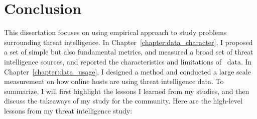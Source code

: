 \chapter{Conclusion}
\label{chapter:conclusion}

This dissertation focuses on using empirical approach to study 
problems surrounding threat intelligence. 
In Chapter~\ref{chapter:data_character}, I proposed 
a set of simple but also fundamental metrics, and measured a broad
set of threat intelligence sources, and reported the 
characteristics and limitations of \ti\ data. In 
Chapter~\ref{chapter:data_usage}, I designed a method and conducted 
a large scale measurement on how online hosts are using threat 
intelligence data. To summarize, I will first highlight the lessons 
I learned from my studies, and then discuss the takeaways of my
study for the community. Here are the high-level lessons from my 
threat intelligence study:

